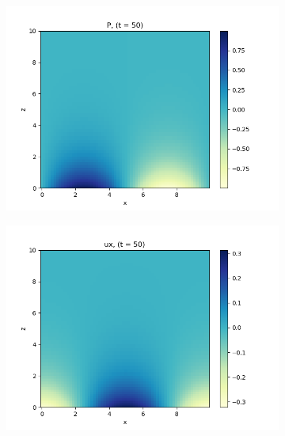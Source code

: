 \documentclass[11pt,
        usenames, %
        dvipsnames %
    ]{report}
\begin{document}
\begin{figure}[!h]
    \centering
    \begin{subfigure}{0.3\textwidth}
        \centering
        \includegraphics[width=\textwidth]{plots/no_g_P_t50.png}
    \end{subfigure}
    \begin{subfigure}{0.3\textwidth}
        \centering
        \includegraphics[width=\textwidth]{plots/no_g_ux_t50.png}
    \end{subfigure}
    \begin{subfigure}{0.3\textwidth}
        \centering

\end{subfigure}
\end{figure}
\end{document}
